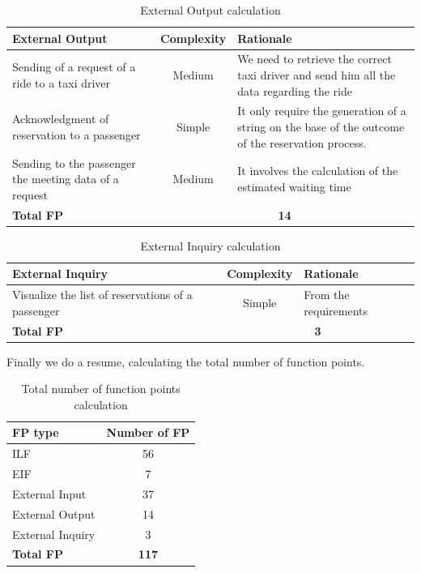 \begin{table}[H]
\centering
\begin{tabular}{ p{} | c | p{} }
\textbf{External Output} & \textbf{Complexity} & \textbf{Rationale} \\ \hline
Sending of a request of a ride to a taxi driver & Medium & We need to retrieve the correct taxi driver and send him all the data regarding the ride \\ \hline
Acknowledgment of reservation to a passenger & Simple & It only require the generation of a string on the base of the outcome of the reservation process. \\ \hline
Sending to the passenger the meeting data of a request & Medium & It involves the calculation of the estimated waiting time \\ \hline
\textbf{Total FP} & \multicolumn{2}{c}{\textbf{14}}
\end{tabular}
\caption{External Output calculation}
\end{table}

\begin{table}[H]
\centering
\begin{tabular}{ p{} | c | p{} }
\textbf{External Inquiry} & \textbf{Complexity} & \textbf{Rationale} \\ \hline
Visualize the list of reservations of a passenger & Simple & From the requirements \\ \hline
\textbf{Total FP} & \multicolumn{2}{c}{\textbf{3}}
\end{tabular}
\caption{External Inquiry calculation}
\end{table}
Finally we do a resume, calculating the total number of function points.
\begin{table}[H]
\centering
\begin{tabular}{ l | c }
\textbf{FP type} & \textbf{Number of FP} \\ \hline
ILF & 56 \\ \hline
EIF & 7 \\ \hline
External Input & 37 \\ \hline
External Output & 14 \\ \hline
External Inquiry & 3 \\ \hline
{\large \textbf{Total FP}} & {\large \textbf{117}}
\end{tabular}
\caption{Total number of function points calculation}
\end{table}
